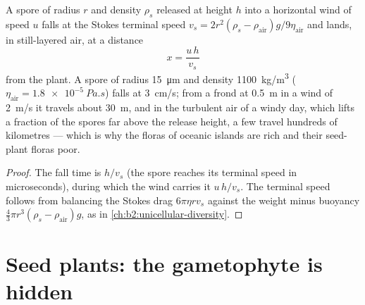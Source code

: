 \begin{theorem}\label{thm:b2:plant-life-cycles:dispersal}
A spore of radius $r$ and density $\rho_s$ released at height $h$
into a horizontal wind of speed $u$ falls at the Stokes terminal
speed $v_s = 2r^2(\rho_s - \rho_{\text{air}})g/9\eta_{\text{air}}$
and lands, in still-layered air, at a distance
\[
x = \frac{u\,h}{v_s}
\]
from the plant. A  spore of radius \qty{15}{\micro m} and
density \qty{1100}{kg/m^3} ($\eta_{\text{air}} = \qty{1.8e-5}{Pa.s}$)
falls at \qty{3}{cm/s}; from a frond at \qty{0.5}{m} in a wind of
\qty{2}{m/s} it travels about \qty{30}{m}, and in the turbulent air
of a windy day, which lifts a fraction of the spores far above the
release height, a few travel hundreds of kilometres --- which is why
the  floras of oceanic islands are rich and their seed-plant
floras poor.
\end{theorem}
\begin{proof}
The fall time is $h/v_s$ (the spore reaches its terminal speed in
microseconds), during which the wind carries it $u\,h/v_s$. The
terminal speed follows from balancing the Stokes drag $6\pi\eta r
v_s$ against the weight minus buoyancy $\tfrac43\pi r^3(\rho_s -
\rho_{\text{air}})g$, as in \cref{ch:b2:unicellular-diversity}.
\end{proof}

\section{Seed plants: the gametophyte is hidden}

